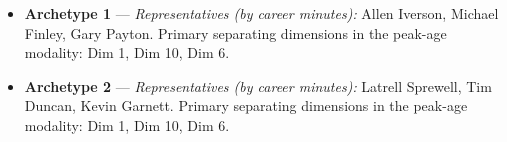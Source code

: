 \begin{itemize}
\item \textbf{Archetype 1} --- \emph{Representatives (by career minutes):} Allen Iverson, Michael Finley, Gary Payton. Primary separating dimensions in the peak-age modality: Dim 1, Dim 10, Dim 6.
\item \textbf{Archetype 2} --- \emph{Representatives (by career minutes):} Latrell Sprewell, Tim Duncan, Kevin Garnett. Primary separating dimensions in the peak-age modality: Dim 1, Dim 10, Dim 6.
\end{itemize}
